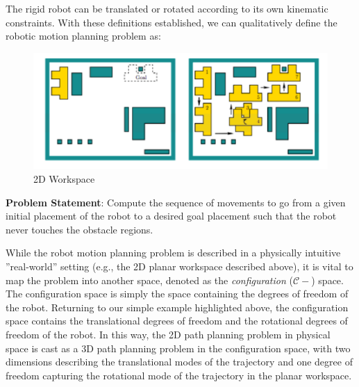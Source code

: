 \documentclass[twoside]{article}
\begin{document}
The rigid robot can be translated or rotated according to its own kinematic constraints. With these definitions established, we can qualitatively define the robotic motion planning problem as:

\begin{figure}[ht!]
\begin{center}
\includegraphics{fig15_1.PNG}
\caption{2D Workspace}
\end{center}
\end{figure}

\textbf{Problem Statement}: Compute the sequence of movements to go from a given initial placement of the robot to a desired goal placement such that the robot never touches the obstacle regions.

While the robot motion planning problem is described in a physically intuitive ”real-world” setting (e.g., the 2D planar workspace described above), it is vital to map the problem into another space, denoted as the \textit{configuration} ($\mathcal{C-}$) space. The configuration space is simply the space containing the degrees of freedom of the robot. Returning to our simple example highlighted above, the configuration space contains
the translational degrees of freedom and the rotational degrees of freedom of the robot. In this way, the 2D path planning problem in physical space is cast as a 3D path planning problem in the configuration space, with two dimensions describing the translational modes of the trajectory and one degree of freedom capturing the rotational mode of the trajectory in the planar workspace.
 
\end{document}

